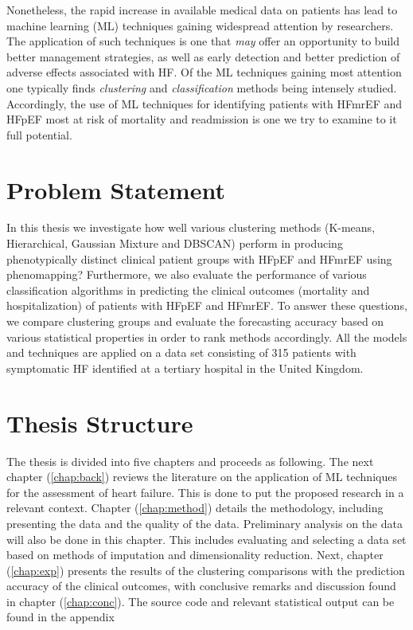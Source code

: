 \documentclass[../thesis.tex]{subfiles}
\begin{document}
\indent Nonetheless, the rapid increase in available medical data on patients has lead to machine learning (ML) techniques gaining widespread attention by researchers. The application of such techniques is one that \textit{may} offer an opportunity to build better management strategies, as well as early detection and better prediction of adverse effects associated with HF. Of the ML techniques gaining most attention one typically finds \textit{clustering} and \textit{classification} methods being intensely studied. Accordingly, the use of ML techniques for identifying patients with HFmrEF and HFpEF most at risk of mortality and readmission is one we try to examine to it full potential.

\section{Problem Statement}
\label{sec:prob_stat}

\noindent In this thesis we investigate how well various clustering methods (K-means, Hierarchical, Gaussian Mixture and DBSCAN) perform in producing phenotypically distinct clinical patient groups with HFpEF and HFmrEF using phenomapping? Furthermore, we also evaluate the performance of various classification algorithms in predicting the clinical outcomes (mortality and hospitalization) of patients with HFpEF and HFmrEF. To answer these questions, we compare clustering groups and evaluate the forecasting accuracy based on various statistical properties in order to rank methods accordingly. All the models and techniques are applied on a data set consisting of 315 patients with symptomatic HF identified at a tertiary hospital in the United Kingdom.  

\section{Thesis Structure}
\label{sec:thesis_struc}

\noindent The thesis is divided into five chapters and proceeds as following. The next chapter (\ref{chap:back}) reviews the literature on the application of ML techniques for the assessment of heart failure. This is done to put the proposed research in a relevant context. Chapter (\ref{chap:method}) details the methodology, including presenting the data and the quality of the data. Preliminary analysis on the data will also be done in this chapter. This includes evaluating and selecting a data set based on methods of imputation and dimensionality reduction. Next, chapter (\ref{chap:exp}) presents the results of the clustering comparisons with the prediction accuracy of the clinical outcomes, with conclusive remarks and discussion found in chapter (\ref{chap:conc}). The source code and relevant statistical output can be found in the appendix  
\end{document}
